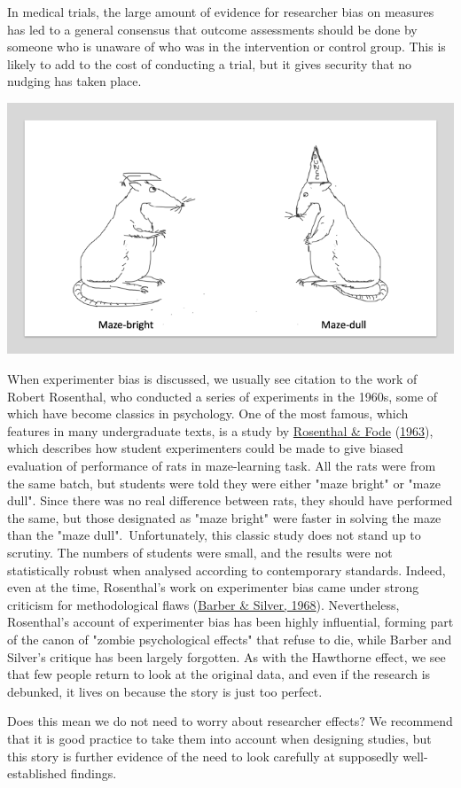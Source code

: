 \documentclass{krantz}
\begin{document}
In medical trials, the large amount of evidence for researcher bias on measures has led to a general consensus that outcome assessments should be done by someone who is unaware of who was in the intervention or control group. This is likely to add to the cost of conducting a trial, but it gives security that no nudging has taken place.

\begin{tcolorbox}[colback=Black!5!lightgray,colframe=black!75!black,coltitle=white,title=Another questionable classic study]\label{box:Rosenthal}

\begin{center}

\includegraphics[width=0.4\linewidth]{images_bw/ratsx2} 
\end{center}
When experimenter bias is discussed, we usually see citation to the work of Robert Rosenthal, who conducted a series of experiments in the 1960s, some of which have become classics in psychology. One of the most famous, which features in many undergraduate texts, is a study by \protect\hyperlink{ref-rosenthal1963}{Rosenthal \& Fode} (\protect\hyperlink{ref-rosenthal1963}{1963}), which describes how student experimenters could be made to give biased evaluation of performance of rats in maze-learning task. All the rats were from the same batch, but students were told they were either "maze bright" or "maze dull". Since there was no real difference between rats, they should have performed the same, but those designated as "maze bright" were faster in solving the maze than the "maze dull".\
Unfortunately, this classic study does not stand up to scrutiny. The numbers of students were small, and the results were not statistically robust when analysed according to contemporary standards. Indeed, even at the time, Rosenthal's work on experimenter bias came under strong criticism for methodological flaws (\protect\hyperlink{ref-barber1968}{Barber \& Silver, 1968}). Nevertheless, Rosenthal's account of experimenter bias has been highly influential, forming part of the canon of "zombie psychological effects" that refuse to die, while Barber and Silver's critique has been largely forgotten. As with the Hawthorne effect, we see that few people return to look at the original data, and even if the research is debunked, it lives on because the story is just too perfect.

Does this mean we do not need to worry about researcher effects? We recommend that it is good practice to take them into account when designing studies, but this story is further evidence of the need to look carefully at supposedly well-established findings.
\end{tcolorbox}
\end{document}
